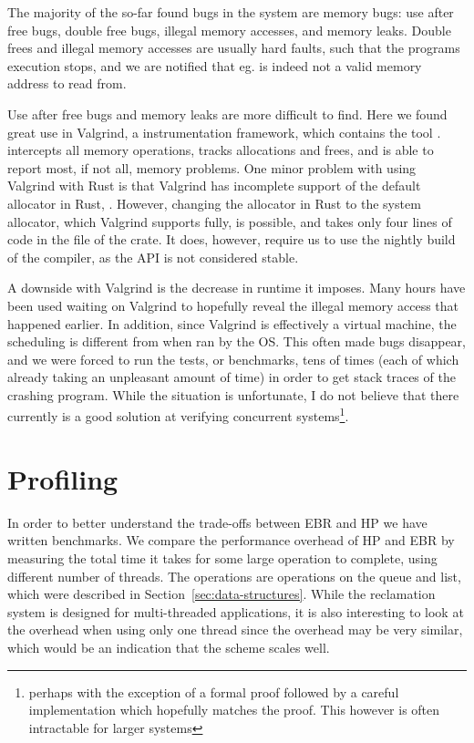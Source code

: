 \documentclass[b5paper]{report}
\begin{document}
The majority of the so-far found bugs in the system are memory bugs: use after
free bugs, double free bugs, illegal memory accesses, and memory leaks. Double
frees and illegal memory accesses are usually hard faults, such that the
programs execution stops, and we are notified that eg.  is indeed not
a valid memory address to read from.

Use after free bugs and memory leaks are more difficult to find. Here we found
great use in Valgrind\cite{valgrind}, a instrumentation framework, which
contains the tool .  intercepts all memory
operations, tracks allocations and frees, and is able to report most, if not
all, memory problems. One minor problem with using Valgrind with Rust is that
Valgrind has incomplete support of the default allocator in Rust,
\cite{jemalloc}. However, changing the allocator in Rust to the system
allocator, which Valgrind supports fully, is possible, and takes only four lines
of code in the  file of the crate. It does, however, require us to
use the nightly build of the compiler, as the API is not considered stable.

A downside with Valgrind is the decrease in runtime it imposes. Many hours have
been used waiting on Valgrind to hopefully reveal the illegal memory access that
happened earlier. In addition, since Valgrind is effectively a virtual machine,
the scheduling is different from when ran by the OS\@. This often made bugs
disappear, and we were forced to run the tests, or benchmarks, tens of times
(each of which already taking an unpleasant amount of time) in order to get
stack traces of the crashing program. While the situation is unfortunate, I do
not believe that there currently is a good solution at verifying concurrent
systems\footnote{perhaps with the exception of a formal proof followed by a
careful implementation which hopefully matches the proof. This however is often
intractable for larger systems}.


\section{Profiling\label{sec:profiling}}

In order to better understand the trade-offs between EBR and HP we have written
benchmarks. We compare the performance overhead of HP and EBR by measuring the
total time it takes for some large operation to complete, using different number
of threads. The operations are  operations on the queue and list, which
were described in Section~\ref{sec:data-structures}. While the reclamation
system is designed for multi-threaded applications, it is also interesting to
look at the overhead when using only one thread since the overhead may be very
similar, which would be an indication that the scheme scales well.
\end{document}
